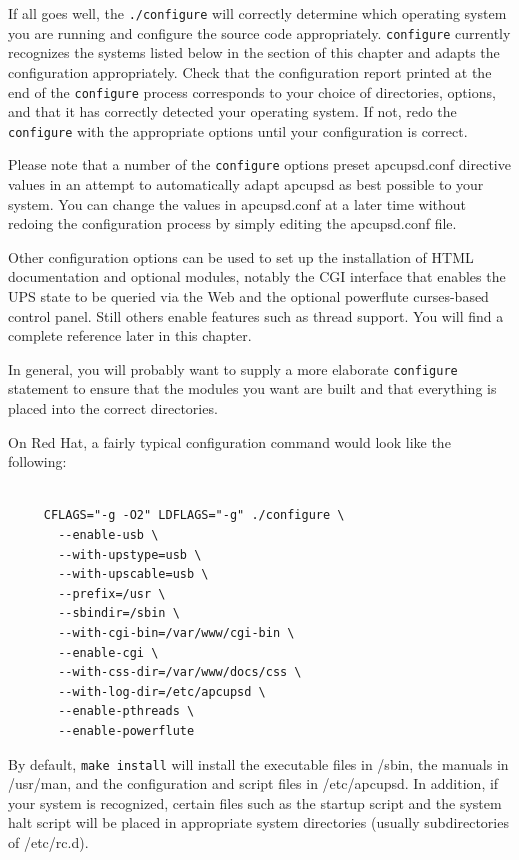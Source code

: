 If all goes well, the {\tt ./configure} will correctly determine which
operating system you are running and configure the source code appropriately.
{\tt configure} currently recognizes the systems listed below in the 
section of this chapter and adapts the configuration appropriately.  Check
that the configuration report printed at the end of the {\tt configure}
process corresponds to your choice of directories, options, and that it has
correctly detected your operating system.  If not, redo the {\tt configure}
with the appropriate options until your configuration is correct.  

Please note that a number of the {\tt configure} options preset apcupsd.conf
directive values in an attempt to automatically adapt apcupsd as best possible
to your system.  You can change the values in apcupsd.conf at a later time
without redoing the configuration process by simply editing the apcupsd.conf
file.  

Other configuration options can be used to set up the installation of HTML
documentation and optional modules, notably the CGI interface that enables the
UPS state to be queried via the Web and the optional powerflute curses-based
control panel.  Still others enable features such as thread support.  You will
find a complete reference later in this chapter.  

In general, you will probably want to supply a more elaborate {\tt configure}
statement to ensure that the modules you want are built and that everything is
placed into the correct directories.  

On Red Hat, a fairly typical configuration command would look like the
following: 

\footnotesize
\begin{verbatim}
     
     CFLAGS="-g -O2" LDFLAGS="-g" ./configure \
       --enable-usb \
       --with-upstype=usb \
       --with-upscable=usb \
       --prefix=/usr \
       --sbindir=/sbin \
       --with-cgi-bin=/var/www/cgi-bin \
       --enable-cgi \
       --with-css-dir=/var/www/docs/css \
       --with-log-dir=/etc/apcupsd \
       --enable-pthreads \
       --enable-powerflute
\end{verbatim}
\normalsize

By default, {\tt make install} will install the executable files in /sbin, the
manuals in /usr/man, and the configuration and script files in /etc/apcupsd.
In addition, if your system is recognized, certain files such as the startup
script and the system halt script will be placed in appropriate system
directories (usually subdirectories of /etc/rc.d). 

